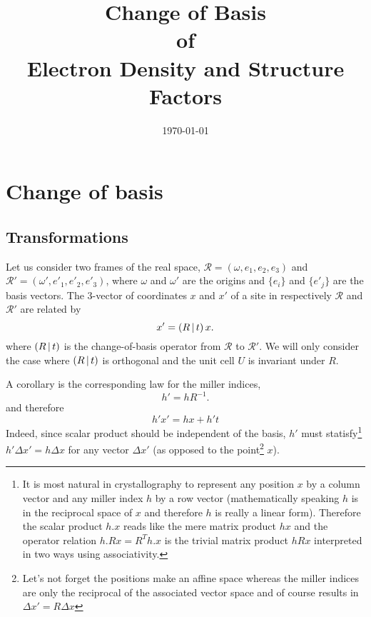 \documentclass[11pt]{article}
\title{Change of Basis\\of\\Electron Density and Structure Factors}
\author{\lucjbourhis}
\date{\today}
\begin{document}
\maketitle

\section{Change of basis}

\subsection{Transformations}

Let us consider two frames of the real space, $\mathcal{R}=(\omega, e_1, e_2, e_3)$ and $\mathcal{R}'=(\omega', e'_1, e'_2, e'_3)$, where $\omega$ and $\omega'$ are the origins and $\{e_i\}$ and $\{e'_j\}$ are the basis vectors. The 3-vector of coordinates $x$ and $x'$ of a site in respectively $\mathcal{R}$ and $\mathcal{R}'$ are related by
\begin{equation}
x' = \left( R\,\vert\, t \right)x.
\label{eqn:change::of::basis::position}
\end{equation}
where $\left( R\,\vert\, t \right)$ is the change-of-basis operator from $\mathcal{R}$ to $\mathcal{R}'$. We will only consider the case where $\left( R\,\vert\, t \right)$ is orthogonal and the unit cell $U$ is invariant under $R$.

A corollary is the corresponding law for the miller indices,
\begin{equation}
h' = hR^{-1}.
\label{eqn:change::of::basis::miller::index}
\end{equation}
and therefore
\begin{equation}
h'x' = hx + h't
\label{eqn:change::of::basis::hx}
\end{equation}
Indeed, since scalar product should be independent of the basis, $h'$ must statisfy\footnote{It is most natural in crystallography to represent any position $x$ by a column vector and any miller index $h$ by a row vector (mathematically speaking $h$ is in the reciprocal space of $x$ and therefore $h$ is really a linear form). Therefore the scalar product $h.x$ reads like the mere matrix product $hx$ and the operator relation $h.Rx = R^Th.x$ is the trivial matrix product $hRx$ interpreted in two ways using associativity.} $h'\Delta x' = h\Delta x$ for any vector $\Delta x'$ (as opposed to the point\footnote{Let's not forget the positions make an affine space whereas the miller indices are only the reciprocal of the associated vector space and of course  results in $\Delta x' = R \Delta x$} $x$).
\end{document}

